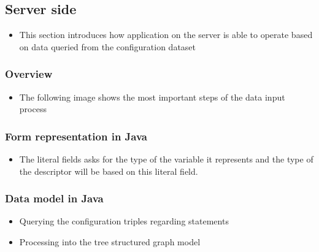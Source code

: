 \newpage
\subsection{Server side} 

\begin{itemize}
	\item This section introduces how application on the server is able to operate based on data queried from the configuration dataset
	
\end{itemize}

\subsubsection{Overview}

\begin{itemize}
	\item The following image shows the most important steps of the data input process
\end{itemize}



\subsubsection{Form representation in Java}


\begin{itemize}
	\item The literal fields asks for the type of the variable it represents and the type of the descriptor will be based on this literal field.
\end{itemize}



\subsubsection{Data model in Java}


\begin{itemize}
	\item Querying the configuration triples regarding statements
	\item Processing into the tree structured graph model
\end{itemize}



